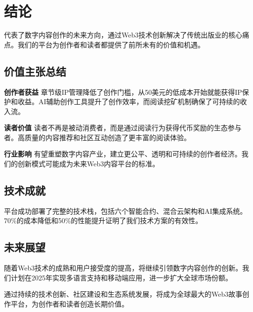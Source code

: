 \section{结论}\label{sec:conclusion-cn}

\storyhouse{}代表了数字内容创作的未来方向，通过Web3技术创新解决了传统出版业的核心痛点。我们的平台为创作者和读者都提供了前所未有的价值和机遇。

\subsection{价值主张总结}

\textbf{创作者获益}
章节级IP管理降低了创作门槛，从50美元的低成本开始就能获得IP保护和收益。AI辅助创作工具提升了创作效率，而阅读挖矿机制确保了可持续的收入流。

\textbf{读者价值}
读者不再是被动消费者，而是通过阅读行为获得\tip{}代币奖励的生态参与者。高质量的内容推荐和社区互动创造了更丰富的阅读体验。

\textbf{行业影响}
\storyhouse{}有望重塑数字内容产业，建立更公平、透明和可持续的创作者经济。我们的创新模式可能成为未来Web3内容平台的标准。

\subsection{技术成就}

平台成功部署了完整的技术栈，包括六个智能合约、混合云架构和AI集成系统。70\%的成本降低和50\%的性能提升证明了我们技术方案的有效性。

\subsection{未来展望}

随着Web3技术的成熟和用户接受度的提高，\storyhouse{}将继续引领数字内容创作的创新。我们计划在2025年实现多语言支持和移动端应用，进一步扩大全球市场份额。

通过持续的技术创新、社区建设和生态系统发展，\storyhouse{}将成为全球最大的Web3故事创作平台，为创作者和读者创造长期价值。